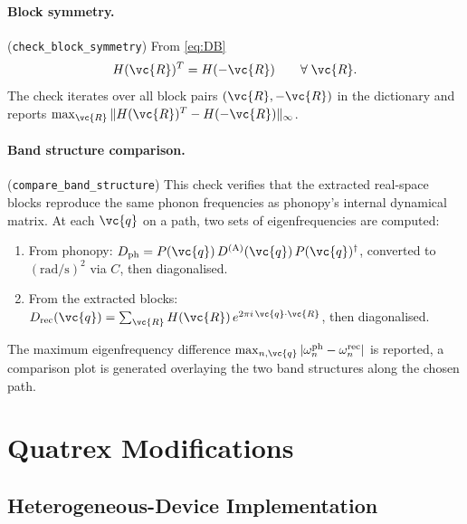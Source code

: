 \paragraph{Block symmetry.}
(\texttt{check\_block\_symmetry})
From \eqref{eq:DB}
\begin{equation}\label{eq:block_sym}
  H(\vc{R})^T = H(-\vc{R})
  \qquad \forall\;\vc{R}.
\end{equation}
The check iterates over all block pairs $(\vc{R}, -\vc{R})$ in the
dictionary and reports $\max_{\vc{R}} \|H(\vc{R})^T - H(-\vc{R})\|_\infty$.


\paragraph{Band structure comparison.}
(\texttt{compare\_band\_structure})
This check verifies that the extracted real-space blocks reproduce the
same phonon frequencies as phonopy's internal dynamical matrix.  At each
$\vc{q}$ on a path, two sets of eigenfrequencies are
computed:
\begin{enumerate}
  \item From phonopy:
        $D_\text{ph} = P(\vc{q})\,D^{(\mathrm{A})}(\vc{q})\,P(\vc{q})^\dagger$,
        converted to $(\text{rad/s})^2$ via $C$, then diagonalised.
  \item From the extracted blocks:
        $D_\text{rec}(\vc{q}) = \sum_{\vc{R}} H(\vc{R})\,
         e^{2\pi i\,\vc{q}\cdot\vc{R}}$,
        then diagonalised.
\end{enumerate}
The maximum eigenfrequency difference
$\max_{n,\vc{q}} |\omega_n^\text{ph} - \omega_n^\text{rec}|$ is
reported, a comparison plot is generated overlaying
the two band structures along the chosen path.

\section{Quatrex Modifications}
\label{sec:quatrex-mods}


\subsection{Heterogeneous-Device Implementation}
\label{sec:heterogeneous}

